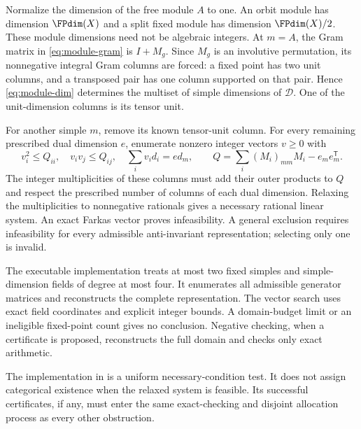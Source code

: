 Normalize the dimension of the free module $A$ to one. An orbit module
has dimension $\FPdim(X)$ and a split fixed module has dimension
$\FPdim(X)/2$. These module dimensions need not be algebraic integers.
At $m=A$, the Gram matrix in \eqref{eq:module-gram} is $I+M_g$.
Since $M_g$ is an involutive permutation, its nonnegative integral Gram
columns are forced: a fixed point has two unit columns, and a transposed
pair has one column supported on that pair. Hence
\eqref{eq:module-dim} determines the multiset of simple dimensions of
$\mathcal D$. One of the unit-dimension columns is its tensor unit.

For another simple $m$, remove its known tensor-unit column. For every
remaining prescribed dual dimension $e$, enumerate nonzero integer
vectors $v\ge0$ with
\[
 v_i^2\le Q_{ii},\quad v_iv_j\le Q_{ij},\quad
 \sum_i v_i d_i=e d_m,
 \qquad Q=\sum_i(M_i)_{mm}M_i-e_me_m^{\mathsf T}.
\]
The integer multiplicities of these columns must add their outer
products to $Q$ and respect the prescribed number of columns of each
dual dimension. Relaxing the multiplicities to nonnegative rationals
gives a necessary rational linear system. An exact Farkas vector proves
infeasibility. A general exclusion requires infeasibility for every
admissible anti-invariant representation; selecting only one is invalid.

The executable implementation treats at most two fixed simples and
simple-dimension fields of degree at most four. It enumerates all
admissible generator matrices and reconstructs the complete representation.
The vector search uses exact field coordinates and explicit integer
bounds. A domain-budget limit or an ineligible fixed-point count gives
no conclusion. Negative checking, when a certificate is proposed,
reconstructs the full domain and checks only exact arithmetic.


The implementation in  is a
uniform necessary-condition test. It does not assign categorical
existence when the relaxed system is feasible. Its successful
certificates, if any, must enter the same exact-checking and disjoint
allocation process as every other obstruction.









